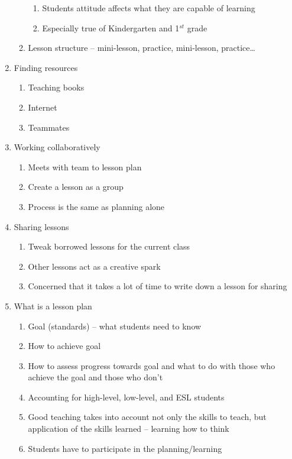 \begin{enumerate}
\begin{enumerate}
\begin{enumerate}
		\item Students attitude affects what they are capable of learning
		\item Especially true of Kindergarten and 1$^{st}$ grade
		\end{enumerate}
	\item Lesson structure -- mini-lesson, practice, mini-lesson, practice\ldots
	\end{enumerate}
\item Finding resources
	\begin{enumerate}
	\item Teaching books
	\item Internet
	\item Teammates
	\end{enumerate}
\item Working collaboratively
	\begin{enumerate}
		\item Meets with team to lesson plan
		\item Create a lesson as a group
		\item Process is the same as planning alone
	\end{enumerate}
\item Sharing lessons
	\begin{enumerate}
		\item Tweak borrowed lessons for the current class
		\item Other lessons act as a creative spark
		\item Concerned that it takes a lot of time to write down a lesson for
			sharing
	\end{enumerate}
\item What is a lesson plan
	\begin{enumerate}
	\item Goal (standards) -- what students need to know
	\item How to achieve goal
	\item How to assess progress towards goal and what to do with those who
		achieve the goal and those who don't
	\item Accounting for high-level, low-level, and ESL students
	\item Good teaching takes into account not only the skills to teach, but
		application of the skills learned -- learning how to think
	\item Students have to participate in the planning/learning
	\end{enumerate}
\end{enumerate}

\endgroup

